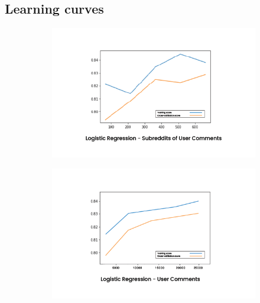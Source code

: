 \documentclass{article}
\begin{document}
\subsection{Learning curves}
    
    \begin{figure}[H]
        \begin{subfigure}[t]{.5\textwidth}
            \centering
            \includegraphics[width=\linewidth]{1}
        \end{subfigure}
        \hfill
        \begin{subfigure}[t]{.5\textwidth}
            \centering
            \includegraphics[width=\linewidth]{2}
        \end{subfigure}
    \end{figure}
\end{document}

